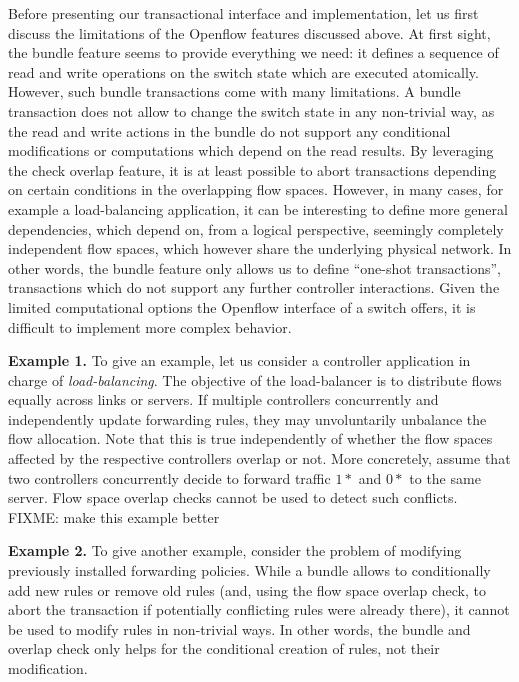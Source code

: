 \documentclass[conference]{sigcomm-alternate}
\begin{document}
Before presenting our transactional interface and implementation,
let us first discuss the limitations of the Openflow features discussed above.
At first sight, the bundle feature seems to provide everything
we need: it defines a sequence of read and write operations
 on the switch state which are executed atomically.
 However, such bundle transactions come with many
 limitations. A bundle transaction does not allow
 to change the switch state in any non-trivial way,
 as the read and write actions in the bundle do
 not support any conditional modifications or computations which
 depend on the read results. By leveraging
 the check overlap feature, it is at least possible
 to abort transactions depending on certain conditions
 in the overlapping
 flow spaces. However, in many cases, for example
 a load-balancing application,
 it can be interesting to define more general
 dependencies, which depend on, from a logical perspective,
 seemingly
 completely independent flow spaces,
 which however share the underlying physical network.
In other words, the bundle feature only allows us to
define ``one-shot transactions'',
transactions which do not support any further controller interactions.
Given
the limited computational options the Openflow interface of a switch offers,
it is difficult to implement more complex behavior.

\textbf{Example 1.} To give an example, let us consider a controller application in charge
of \emph{load-balancing}. The objective of the load-balancer
is to distribute flows equally across links or servers.
If multiple controllers concurrently and independently
update forwarding rules, they may unvoluntarily
unbalance the flow allocation. Note that this
is true independently of whether the flow spaces
affected by the respective controllers overlap or not.
More concretely, assume that two controllers concurrently
decide to forward traffic $1*$ and $0*$ to the same server.
Flow space overlap checks cannot be used to detect
such conflicts.
FIXME: make this example better

\textbf{Example 2.} To give another example,
consider the problem of modifying previously
installed forwarding policies.
While a bundle allows to conditionally add new rules or remove
old rules (and, using the flow space overlap
check, to abort the transaction if potentially conflicting
rules were already there), it cannot be used
to modify rules in non-trivial ways.
In other words, the bundle and overlap check only helps
for the conditional creation of rules, not their modification.
\end{document}
